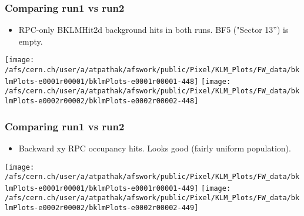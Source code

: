 \documentclass{beamer}
\begin{document}
\begin{frame}
\frametitle{Comparing run1 vs run2}
\vspace*{.05cm}

\begin{itemize} 
\item {\small RPC-only BKLMHit2d background hits in both runs. BF5 ("Sector 13'') is empty.  }
\end{itemize}

\begin{center}
\begin{normalsize}

\vspace*{-.2cm}
\begin{center}

\texttt{[image: /afs/cern.ch/user/a/atpathak/afswork/public/Pixel/KLM\_Plots/FW\_data/bklmPlots-e0001r00001/bklmPlots-e0001r00001-448]}
\texttt{[image: /afs/cern.ch/user/a/atpathak/afswork/public/Pixel/KLM\_Plots/FW\_data/bklmPlots-e0002r00002/bklmPlots-e0002r00002-448]} \\

\end{center}
\end{normalsize}
\end{center}
\end{frame}
\begin{frame}
\frametitle{Comparing run1 vs run2}
\vspace*{.05cm}

\begin{itemize} 
\item {\small Backward xy RPC occupancy hits. Looks good (fairly uniform population).}
\end{itemize}

\begin{center}
\begin{normalsize}

\vspace*{-.2cm}
\begin{center}

\texttt{[image: /afs/cern.ch/user/a/atpathak/afswork/public/Pixel/KLM\_Plots/FW\_data/bklmPlots-e0001r00001/bklmPlots-e0001r00001-449]}
\texttt{[image: /afs/cern.ch/user/a/atpathak/afswork/public/Pixel/KLM\_Plots/FW\_data/bklmPlots-e0002r00002/bklmPlots-e0002r00002-449]} \\

\end{center}
\end{normalsize}
\end{center}
\end{frame}
\end{document}
